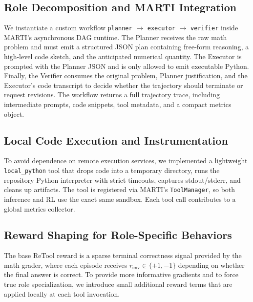\documentclass{article}
\begin{document}
\subsection{Role Decomposition and MARTI Integration}
We instantiate a custom workflow 
\texttt{planner} $\rightarrow$ \texttt{executor} $\rightarrow$ \texttt{verifier}
inside MARTI's asynchronous DAG runtime. The Planner receives the raw math problem and 
must emit a structured JSON plan containing free-form reasoning, a high-level code sketch, 
and the anticipated numerical quantity. The Executor is prompted with the Planner JSON and 
is only allowed to emit executable Python. Finally, the Verifier consumes the original problem, 
Planner justification, and the Executor's code transcript to decide whether the trajectory should 
terminate or request revisions. The workflow returns a full trajectory trace, including 
intermediate prompts, code snippets, tool metadata, and a compact metrics object.

\subsection{Local Code Execution and Instrumentation}
To avoid dependence on remote execution services, we implemented a lightweight 
\texttt{local\_python} tool that drops code into a temporary directory, runs the repository 
Python interpreter with strict timeouts, captures stdout/stderr, and cleans up artifacts. The tool 
is registered via MARTI's \texttt{ToolManager}, so both inference and RL use the exact same sandbox. 
Each tool call contributes to a global metrics collector.

\subsection{Reward Shaping for Role-Specific Behaviors}
The base ReTool reward is a sparse terminal correctness signal provided by the
math grader, where each episode receives $r_{\mathrm{env}} \in \{+1,-1\}$ depending on
whether the final answer is correct. To provide more informative gradients and to 
force true role specialization, we introduce small additional reward terms that
are applied locally at each tool invocation.
\end{document}
